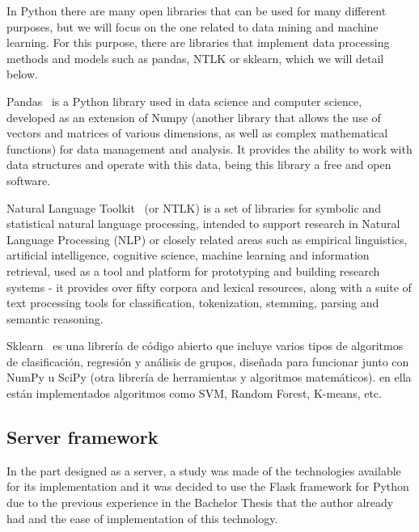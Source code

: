 In Python there are many open libraries that can be used for many different purposes, but we will focus on the one related to data mining and machine learning. For this purpose, there are libraries that implement data processing methods and models such as pandas, NTLK or sklearn, which we will detail below.

Pandas~\cite{pandasPy20:online} is a Python library used in data science and computer science, developed as an extension of Numpy (another library that allows the use of vectors and matrices of various dimensions, as well as complex mathematical functions) for data management and analysis. It provides the ability to work with data structures and operate with this data, being this library a free and open software.

Natural Language Toolkit~\cite{NLTKNatu6:online} (or NTLK) is a set of libraries for symbolic and statistical natural language processing, intended to support research in Natural Language Processing (NLP) or closely related areas such as empirical linguistics, artificial intelligence, cognitive science, machine learning and information retrieval, used as a tool and platform for prototyping and building research systems - it provides over fifty corpora and lexical resources, along with a suite of text processing tools for classification, tokenization, stemming, parsing and semantic reasoning.

Sklearn~\cite{scikitle66:online} es una librería de código abierto que incluye varios tipos de algoritmos de clasificación, regresión y análisis de grupos, diseñada para funcionar junto con NumPy u SciPy (otra librería de herramientas y algoritmos matemáticos). en ella están implementados algoritmos como SVM, Random Forest, K-means, etc.





\subsection{Server framework}
In the part designed as a server, a study was made of the technologies available for its implementation and it was decided to use the Flask framework for Python due to the previous experience in the Bachelor Thesis that the author already had and the ease of implementation of this technology.

